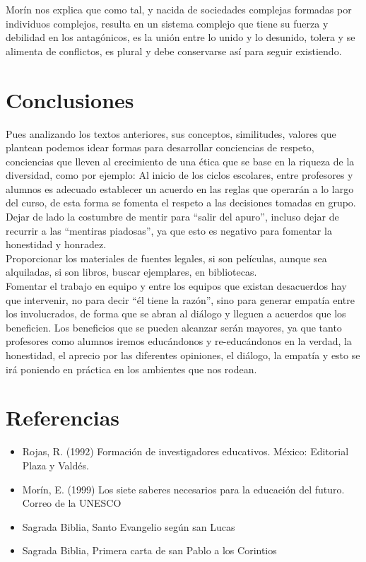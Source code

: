 \documentclass[12pt]{book} %
\begin{document}
Morín nos explica que como tal, y nacida de sociedades complejas formadas por individuos complejos, resulta en un sistema complejo que tiene su fuerza y debilidad en los antagónicos, es la unión entre lo unido y lo desunido, tolera y se alimenta de conflictos, es plural y debe conservarse así para seguir existiendo.

\section{Conclusiones}
Pues analizando los textos anteriores, sus conceptos, similitudes, valores que plantean podemos idear formas para desarrollar conciencias de respeto, conciencias que lleven al crecimiento de una ética que se base en la riqueza de la diversidad, como por ejemplo:
Al inicio de los ciclos escolares, entre profesores y alumnos es adecuado establecer un acuerdo en las reglas que operarán a lo largo del curso, de esta forma se fomenta el respeto a las decisiones tomadas en grupo.\\

Dejar de lado la costumbre de mentir para “salir del apuro”, incluso dejar de recurrir a las “mentiras piadosas”, ya que esto es negativo para fomentar la honestidad y honradez.\\

Proporcionar los materiales de fuentes legales, si son películas, aunque sea alquiladas, si son libros, buscar ejemplares, en bibliotecas.\\

Fomentar el trabajo en equipo y entre los equipos que existan desacuerdos hay que intervenir, no para decir “él tiene la razón”, sino para generar empatía entre los involucrados, de forma que se abran al diálogo y lleguen a acuerdos que los beneficien.
Los beneficios que se pueden alcanzar serán mayores, ya que tanto profesores como alumnos iremos educándonos y re-educándonos en la verdad, la honestidad, el aprecio por las diferentes opiniones, el diálogo, la empatía y esto se irá poniendo en práctica en los ambientes que nos rodean.

\section{Referencias}
\begin{itemize}
\item Rojas, R. (1992) Formación de investigadores educativos. México: Editorial Plaza y Valdés.
\item Morín, E. (1999) Los siete saberes necesarios para la educación del futuro. Correo de la UNESCO
\item Sagrada Biblia, Santo Evangelio según san Lucas
\item Sagrada Biblia, Primera carta de san Pablo a los Corintios
\end{itemize}
\end{document}
